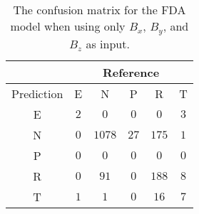 \begin{table}[!ht]
	\centering
	\begin{tabular}{|c|c|c|c|c|c|}
		\hline
		 & \multicolumn{5}{|c|}{Reference} \\ \hline
		 Prediction & E & N & P & R & T \\ \hline
		 E & $2$ & $0$ & $0$ & $0$ & $3$ \\ \hline
		 N & $0$ & $1078$ & $27$ & $175$ & $1$ \\ \hline
		 P & $0$ & $0$ & $0$ & $0$ & $0$ \\ \hline
		 R & $0$ & $91$ & $0$ & $188$ & $8$ \\ \hline
		 T & $1$ & $1$ & $0$ & $16$ & $7$ \\ \hline
	\end{tabular}
	\caption{The confusion matrix for the FDA model when using only $B_{x}$, $B_{y}$, and $B_{z}$ as input.}
	\label{tab:cm:coord:fda}
\end{table}
